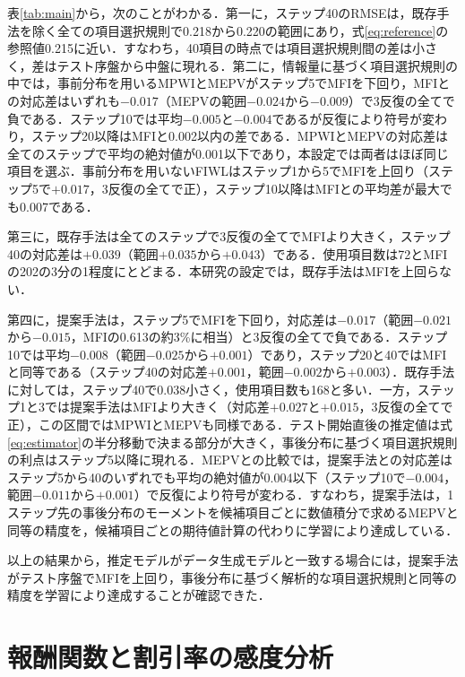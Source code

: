 \documentclass[a4paper,12pt,oneside,openany]{jsbook}
\begin{document}
表\ref{tab:main}から，次のことがわかる．第一に，ステップ40のRMSEは，既存手法を除く全ての項目選択規則で0.218から0.220の範囲にあり，式\eqref{eq:reference}の参照値0.215に近い．すなわち，40項目の時点では項目選択規則間の差は小さく，差はテスト序盤から中盤に現れる．第二に，情報量に基づく項目選択規則の中では，事前分布を用いるMPWIとMEPVがステップ5でMFIを下回り，MFIとの対応差はいずれも$-0.017$（MEPVの範囲$-0.024$から$-0.009$）で3反復の全てで負である．ステップ10では平均$-0.005$と$-0.004$であるが反復により符号が変わり，ステップ20以降はMFIと0.002以内の差である．MPWIとMEPVの対応差は全てのステップで平均の絶対値が0.001以下であり，本設定では両者はほぼ同じ項目を選ぶ．事前分布を用いないFIWLはステップ1から5でMFIを上回り（ステップ5で$+0.017$，3反復の全てで正），ステップ10以降はMFIとの平均差が最大でも0.007である．

第三に，既存手法は全てのステップで3反復の全てでMFIより大きく，ステップ40の対応差は$+0.039$（範囲$+0.035$から$+0.043$）である．使用項目数は72とMFIの202の3分の1程度にとどまる．本研究の設定では，既存手法はMFIを上回らない．

第四に，提案手法は，ステップ5でMFIを下回り，対応差は$-0.017$（範囲$-0.021$から$-0.015$，MFIの0.613の約3\%に相当）と3反復の全てで負である．ステップ10では平均$-0.008$（範囲$-0.025$から$+0.001$）であり，ステップ20と40ではMFIと同等である（ステップ40の対応差$+0.001$，範囲$-0.002$から$+0.003$）．既存手法に対しては，ステップ40で0.038小さく，使用項目数も168と多い．一方，ステップ1と3では提案手法はMFIより大きく（対応差$+0.027$と$+0.015$，3反復の全てで正），この区間ではMPWIとMEPVも同様である．テスト開始直後の推定値は式\eqref{eq:estimator}の半分移動で決まる部分が大きく，事後分布に基づく項目選択規則の利点はステップ5以降に現れる．MEPVとの比較では，提案手法との対応差はステップ5から40のいずれでも平均の絶対値が0.004以下（ステップ10で$-0.004$，範囲$-0.011$から$+0.001$）で反復により符号が変わる．すなわち，提案手法は，1ステップ先の事後分布のモーメントを候補項目ごとに数値積分で求めるMEPVと同等の精度を，候補項目ごとの期待値計算の代わりに学習により達成している．

以上の結果から，推定モデルがデータ生成モデルと一致する場合には，提案手法がテスト序盤でMFIを上回り，事後分布に基づく解析的な項目選択規則と同等の精度を学習により達成することが確認できた．

\section{報酬関数と割引率の感度分析}\label{sec:sensitivity}
\end{document}
